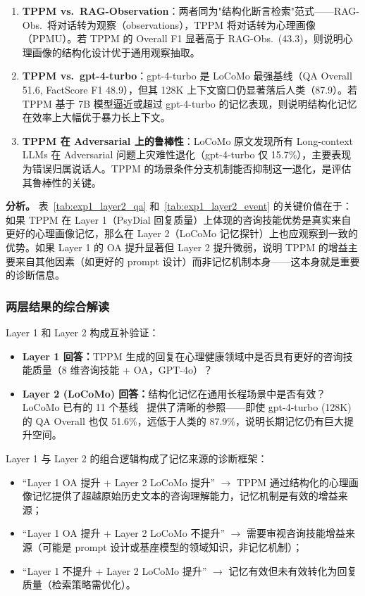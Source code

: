 \documentclass[12pt,a4paper]{article}
\begin{document}
\begin{enumerate}
  \item \textbf{TPPM vs.\ RAG-Observation}：两者同为"结构化断言检索"范式——RAG-Obs.\ 将对话转为观察（observations），TPPM 将对话转为心理画像（PPMU）。若 TPPM 的 Overall F1 显著高于 RAG-Obs.\ (43.3)，则说明心理画像的结构化设计优于通用观察抽取。

  \item \textbf{TPPM vs.\ gpt-4-turbo}：gpt-4-turbo 是 LoCoMo 最强基线（QA Overall 51.6, FactScore F1 48.9），但其 128K 上下文窗口仍显著落后人类（87.9）。若 TPPM 基于 7B 模型逼近或超过 gpt-4-turbo 的记忆表现，则说明结构化记忆在效率上大幅优于暴力长上下文。

  \item \textbf{TPPM 在 Adversarial 上的鲁棒性}：LoCoMo 原文发现所有 Long-context LLMs 在 Adversarial 问题上灾难性退化（gpt-4-turbo 仅 15.7\%），主要表现为错误归属说话人。TPPM 的场景条件分支机制能否抑制这一退化，是评估其鲁棒性的关键。
\end{enumerate}

\textbf{分析。} 表~\ref{tab:exp1_layer2_qa} 和~\ref{tab:exp1_layer2_event} 的关键价值在于：如果 TPPM 在 Layer 1（PsyDial 回复质量）上体现的咨询技能优势是真实来自更好的心理画像记忆，那么在 Layer 2（LoCoMo 记忆探针）上也应观察到一致的优势。如果 Layer 1 的 OA 提升显著但 Layer 2 提升微弱，说明 TPPM 的增益主要来自其他因素（如更好的 prompt 设计）而非记忆机制本身——这本身就是重要的诊断信息。

\subsubsection{两层结果的综合解读}

Layer 1 和 Layer 2 构成互补验证：

\begin{itemize}
  \item \textbf{Layer 1 回答：}TPPM 生成的回复在心理健康领域中是否具有更好的咨询技能质量（8 维咨询技能 + OA，GPT-4o）？
  \item \textbf{Layer 2 (LoCoMo) 回答：}结构化记忆在通用长程场景中是否有效？LoCoMo 已有的 11 个基线~\cite{maharana2024locomo} 提供了清晰的参照——即使 gpt-4-turbo (128K) 的 QA Overall 也仅 51.6\%，远低于人类的 87.9\%，说明长期记忆仍有巨大提升空间。
\end{itemize}

Layer 1 与 Layer 2 的组合逻辑构成了记忆来源的诊断框架：
\begin{itemize}
  \item ``Layer 1 OA 提升 + Layer 2 LoCoMo 提升'' $\to$ TPPM 通过结构化的心理画像记忆提供了超越原始历史文本的咨询理解能力，记忆机制是有效的增益来源；
  \item ``Layer 1 OA 提升 + Layer 2 LoCoMo 不提升'' $\to$ 需要审视咨询技能增益来源（可能是 prompt 设计或基座模型的领域知识，非记忆机制）；
  \item ``Layer 1 不提升 + Layer 2 LoCoMo 提升'' $\to$ 记忆有效但未有效转化为回复质量（检索策略需优化）。
\end{itemize}
\end{document}
